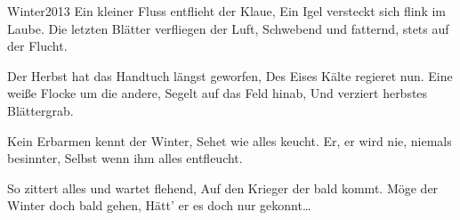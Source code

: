 \begin{poem}{Winter}{2013}
Ein kleiner Fluss entflieht der Klaue,
Ein Igel versteckt sich flink im Laube.
Die letzten Blätter verfliegen der Luft,
Schwebend und fatternd, stets auf der Flucht.

Der Herbst hat das Handtuch längst geworfen,
Des Eises Kälte regieret nun.
Eine weiße Flocke um die andere,
Segelt auf das Feld hinab,
Und verziert herbstes Blättergrab.

Kein Erbarmen kennt der Winter,
Sehet wie alles keucht.
Er, er wird nie, niemals besinnter,
Selbst wenn ihm alles entfleucht.

So zittert alles und wartet flehend,
Auf den Krieger der bald kommt.
Möge der Winter doch bald gehen,
Hätt' er es doch nur gekonnt\ldots
\end{poem}